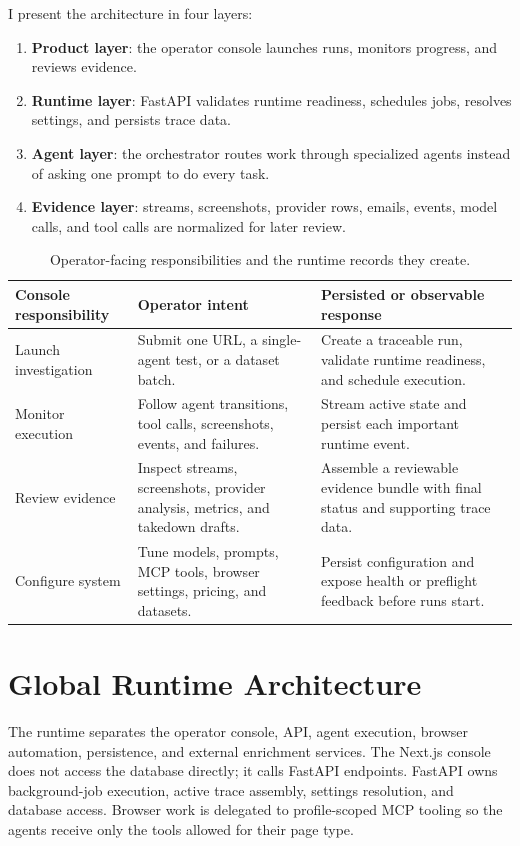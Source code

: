 I present the architecture in four layers:
\begin{enumerate}
  \item \textbf{Product layer}: the operator console launches runs, monitors
  progress, and reviews evidence.
  \item \textbf{Runtime layer}: FastAPI validates runtime readiness, schedules
  jobs, resolves settings, and persists trace data.
  \item \textbf{Agent layer}: the orchestrator routes work through specialized
  agents instead of asking one prompt to do every task.
  \item \textbf{Evidence layer}: streams, screenshots, provider rows, emails,
  events, model calls, and tool calls are normalized for later review.
\end{enumerate}

\begin{table}[!htbp]
\centering
\begin{tabularx}{\textwidth}{Q{3.25cm} Y Y}
\toprule
{}
Console responsibility & Operator intent & Persisted or observable response \\
\midrule
Launch investigation & Submit one URL, a single-agent test, or a dataset batch.
& Create a traceable run, validate runtime readiness, and schedule execution. \\
Monitor execution & Follow agent transitions, tool calls, screenshots, events,
and failures. & Stream active state and persist each important runtime event. \\
Review evidence & Inspect streams, screenshots, provider analysis, metrics, and
takedown drafts. & Assemble a reviewable evidence bundle with final status and
supporting trace data. \\
Configure system & Tune models, prompts, MCP tools, browser settings, pricing,
and datasets. & Persist configuration and expose health or preflight feedback
before runs start. \\
\bottomrule
\end{tabularx}
\caption{Operator-facing responsibilities and the runtime records they create.}\label{tab:architecture-actors}
\end{table}

\section{Global Runtime Architecture}

The runtime separates the operator console, API, agent execution, browser
automation, persistence, and external enrichment services. The Next.js console
does not access the database directly; it calls FastAPI endpoints. FastAPI owns
background-job execution, active trace assembly, settings resolution, and
database access. Browser work is delegated to profile-scoped MCP tooling so the
agents receive only the tools allowed for their page type.


